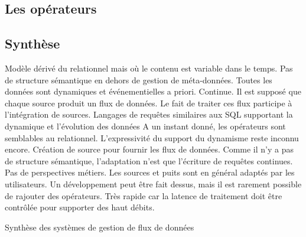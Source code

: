 \subsection{Les opérateurs}
\subsection{Synthèse}
\begin{table}[!ht]
\criteretabDonnee
    {Modèle dérivé du relationnel mais où le contenu est variable dans le temps.}
    {Pas de structure sémantique en dehors de gestion de méta-données.}
    {Toutes les données sont dynamiques et événementielles a priori.}
\criteretabTraitement
    {Continue.}
    {Il est supposé que chaque source produit un flux de données. Le fait de traiter ces flux participe à l'intégration de sources.}
    {Langages de requêtes similaires aux SQL supportant la dynamique et l'évolution des données}
    {A un instant donné, les opérateurs sont semblables au relationnel. L'expressivité du support du dynamisme reste inconnu encore.}
\criteretabAdaptabilite
    {Création de source pour fournir les flux de données. Comme il n'y a pas de structure sémantique, l'adaptation n'est que l'écriture de requêtes continues.}
    {Pas de perspectives métiers.}
    {Les sources et puits sont en général adaptés par les utilisateurs. Un développement peut être fait dessus, mais il est rarement possible de rajouter des opérateurs.}
    {Très rapide car la latence de traitement doit être contrôlée pour supporter des haut débits.}
\caption{Synthèse des systèmes de gestion de flux de données}\label{tab:rw:supervision:sgfd:synthese}
\end{table}
